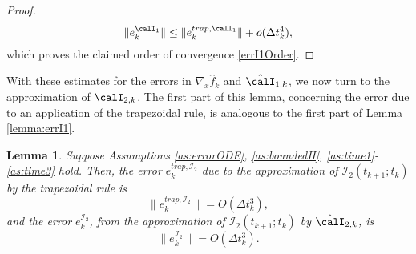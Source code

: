 \documentclass[DIV=12]{scrartcl} %
\newcommand{\err}{\ensuremath{e}}
\newtheorem{lemma}{Lemma}
\theoremstyle{definition}
\begin{document}
\begin{proof}
\[
    \|\err_k^{\calI_1}\|\le \|\err_k^{trap,\calI_1}\|+o(\Delta t_k^4),
\]
which proves the claimed order of convergence \eqref{errI1Order}.
\end{proof}

With these estimates for the errors in $\nabla_x\hat{f}_k$ and $\hat{\calI}_{1,k}$, we now turn to the approximation of $\calI_{2,k}$. The first part of this lemma, concerning the error due to an application of the trapezoidal rule, is analogous to the first part of Lemma \ref{lemma:errI1}. 
\begin{lemma}
\label{lemma:errI2}
Suppose Assumptions \ref{as:errorODE}, \ref{as:boundedH}, \ref{as:time1}-\ref{as:time3} hold. Then, the error $\err_k^{trap,\mathcal{I}_2}$ due to the approximation of $\mathcal{I}_2(t_{k+1};t_k)$ by the trapezoidal rule is
\begin{equation}
    \label{errTrapOrder2}
    \|\err_k^{trap,\mathcal{I}_2}\|=O(\Delta t_k^3),
\end{equation}
and the error $\err_k^{\mathcal{I}_{2}}$, from the approximation of $\mathcal{I}_2(t_{k+1};t_k)$ by $\hat{\calI}_{2,k}$, is
\begin{equation}
    \label{errI2Order}
    \|\err_k^{\mathcal{I}_{2}}\|=O(\Delta t_k^3).
\end{equation}
\end{lemma}
\end{document}
